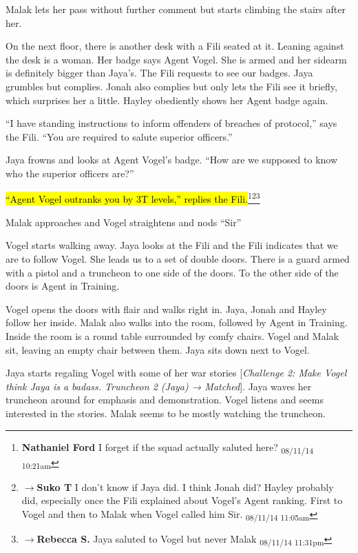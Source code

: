 Malak lets her pass without further comment but starts climbing the stairs after her.



On the next floor, there is another desk with a Fili seated at it.  Leaning against the desk is a woman. Her badge says Agent Vogel.  She is armed and her sidearm is definitely bigger than Jaya's.  The Fili requests to see our badges.  Jaya grumbles but complies.  Jonah also complies but only lets the Fili see it briefly, which surprises her a little.  Hayley obediently shows her Agent badge again.

``I have standing instructions to inform offenders of breaches of protocol,'' says the Fili.  ``You are required to salute superior officers.''

Jaya frowns and looks at Agent Vogel's badge.  ``How are we supposed to know who the superior officers are?''

\hl{``Agent Vogel outranks you by 3T levels,'' replies the Fili.}\footnote{\textbf{Nathaniel Ford }I forget if the squad actually saluted here? \textsubscript{08/11/14 10:21am}}\footnote{$\rightarrow$\textbf{Suko T }I don't know if Jaya did.  I think Jonah did?  Hayley probably did, especially once the Fili explained about Vogel's Agent ranking.  First to Vogel and then to Malak when Vogel called him Sir. \textsubscript{08/11/14 11:05am}}\footnote{$\rightarrow$\textbf{Rebecca S. }Jaya saluted to Vogel but never Malak \textsubscript{08/11/14 11:31pm}}

Malak approaches and Vogel straightens and nods ``Sir''



Vogel starts walking away.  Jaya looks at the Fili and the Fili indicates that we are to follow Vogel.  She leads us to a set of double doors.  There is a guard armed with a pistol and a truncheon to one side of the doors.  To the other side of the doors is Agent in Training.



Vogel opens the doors with flair and walks right in.  Jaya, Jonah and Hayley follow her inside.  Malak also walks into the room, followed by Agent in Training.  Inside the room is a round table surrounded by comfy chairs.  Vogel and Malak sit, leaving an empty chair between them.  Jaya sits down next to Vogel.  



Jaya starts regaling Vogel with some of her war stories {[}\textit{Challenge 2: Make Vogel think Jaya is a badass.  Truncheon 2 (Jaya) → Matched}{]}.  Jaya waves her truncheon around for emphasis and demonstration.  Vogel listens and seems interested in the stories.  Malak seems to be mostly watching the truncheon.



